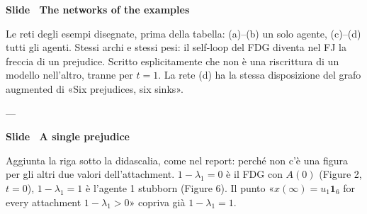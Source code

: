 \par\addvspace{14pt}\noindent\begin{minipage}{\textwidth}
{\color{unipd}\bfseries Slide  \textperiodcentered\ The networks of the examples}\nuova\par\smallskip
{\small Le reti degli esempi disegnate, prima della tabella: (a)--(b) un solo agente, (c)--(d) tutti gli agenti. Stessi archi e stessi pesi: il self-loop del FDG diventa nel FJ la freccia di un prejudice. Scritto esplicitamente che non è una riscrittura di un modello nell'altro, tranne per $t = 1$. La rete (d) ha la stessa disposizione del grafo augmented di «Six prejudices, six sinks».}\par\smallskip
\noindent\begin{minipage}[t]{0.36\textwidth}\par
{\small ---}
\end{minipage}\hfill\begin{minipage}[t]{0.61\textwidth}\par
{}\par\smallskip
\end{minipage}\par
\end{minipage}\par
\par\addvspace{14pt}\noindent\begin{minipage}{\textwidth}
{\color{unipd}\bfseries Slide  \textperiodcentered\ A single prejudice}\par\smallskip
{\small Aggiunta la riga sotto la didascalia, come nel report: perché non c'è una figura per gli altri due valori dell'attachment. $1 - \lambda_1 = 0$ è il FDG con $A(0)$ (Figure 2, $t = 0$), $1 - \lambda_1 = 1$ è l'agente 1 stubborn (Figure 6). Il punto «$x(\infty) = u_1\mathbf{1}_6$ for every attachment $1 - \lambda_1 > 0$» copriva già $1 - \lambda_1 = 1$.}\par\smallskip
\noindent\begin{minipage}[t]{0.36\textwidth}\par
{}\par\smallskip
\end{minipage}\hfill\begin{minipage}[t]{0.61\textwidth}\par
{}\par\smallskip
\end{minipage}\par
\end{minipage}\par
